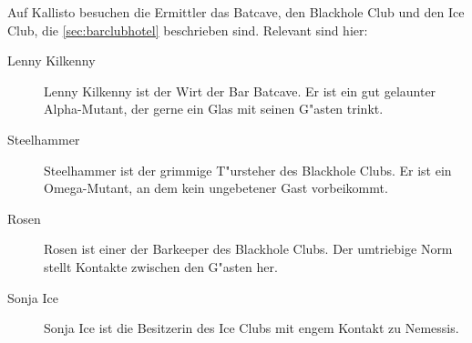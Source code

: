 
Auf Kallisto besuchen die Ermittler das Batcave, den Blackhole Club und den Ice Club, die \cref{sec:barclubhotel} beschrieben sind. Relevant sind hier:

\begin{description}
    \item [Lenny Kilkenny] Lenny Kilkenny ist der Wirt der Bar Batcave. Er ist ein gut gelaunter Alpha-Mutant, der gerne ein Glas mit 
        seinen G"asten trinkt.
    \item [Steelhammer] Steelhammer ist der grimmige T"ursteher des Blackhole Clubs. Er ist ein Omega-Mutant, an dem kein ungebetener Gast 
        vorbeikommt.
    \item [Rosen]  Rosen ist einer der Barkeeper des Blackhole Clubs. Der umtriebige Norm stellt Kontakte zwischen den G"asten her. 
    \item [Sonja Ice] Sonja Ice ist die Besitzerin des Ice Clubs mit engem Kontakt zu Nemessis. 
\end{description}
